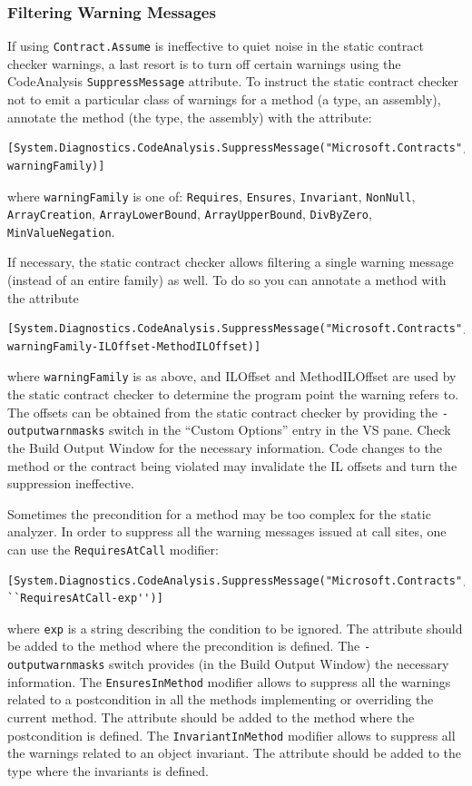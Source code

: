 \documentclass{article}
\newcommand{\code}[1]{\lstinline{#1}}
\begin{document}
\subsubsection{Filtering Warning Messages}
\label{sec:filteringstaticcheckerwarnings}

If using \code{Contract.Assume} is ineffective to quiet noise in the
static contract checker warnings, a last resort is to turn off certain warnings
using the CodeAnalysis \code{SuppressMessage} attribute.
To instruct the static contract checker not to emit a particular class of
warnings for a method (a type, an assembly), annotate the method (the
type, the assembly) with the attribute:
\begin{lstlisting}
[System.Diagnostics.CodeAnalysis.SuppressMessage("Microsoft.Contracts", warningFamily)]
\end{lstlisting}
where \code{warningFamily} is one of: \code{Requires}, \code{Ensures},
\code{Invariant}, \code{NonNull}, \code{ArrayCreation},
\code{ArrayLowerBound}, \code{ArrayUpperBound}, \code{DivByZero}, \code{MinValueNegation}.

If necessary, the static contract checker allows filtering a single warning message
(instead of an entire family) as well.
To do so you can annotate a method with the attribute
\begin{lstlisting}
[System.Diagnostics.CodeAnalysis.SuppressMessage("Microsoft.Contracts", warningFamily-ILOffset-MethodILOffset)]
\end{lstlisting}
where \code{warningFamily} is as above, and ILOffset and
MethodILOffset are used by the static contract checker to determine
the program point the warning refers to.
The offsets can be obtained from the static contract checker by providing the \code{-outputwarnmasks} switch in the
``Custom Options'' entry in the VS pane. Check the Build Output Window
for the necessary information. Code changes to the method or the
contract being violated may invalidate the IL offsets and turn the
suppression ineffective. 

Sometimes the precondition for a method may be too complex for the static analyzer.
In order to suppress all the warning messages issued at call sites, one can use the \code{RequiresAtCall} modifier:
\begin{lstlisting}
[System.Diagnostics.CodeAnalysis.SuppressMessage("Microsoft.Contracts", ``RequiresAtCall-exp'')]
\end{lstlisting}
where \code{exp} is a string describing the condition to be ignored.
The attribute should be added to the method where the precondition is defined. 
The \code{-outputwarnmasks} switch provides (in the Build Output Window) the necessary information.
The \code{EnsuresInMethod} modifier allows to suppress all the warnings related to  a postcondition   in all the methods implementing or overriding  the current method.
The attribute should be added to the method where the postcondition is defined.
The \code{InvariantInMethod} modifier allows to suppress all the warnings related to an object invariant.
The attribute should be added to the type where the invariants is defined.
\end{document}
